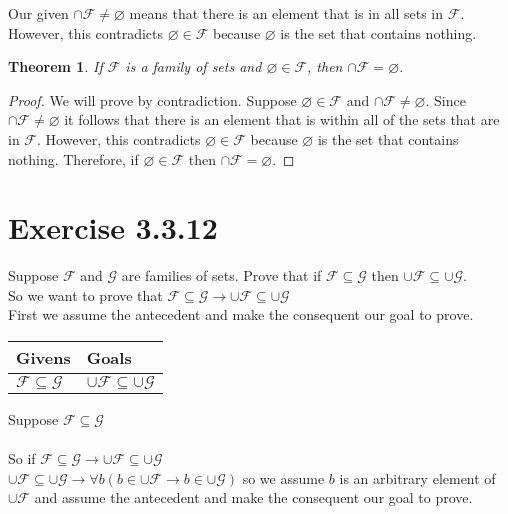 \documentclass{article}
\newcommand{\n}{ \noindent }
\newcommand{\F}{\mathcal{F}}
\newcommand{\G}{\mathcal{G}}
\newtheorem*{theorem}{Theorem}  %
\begin{document}
\n Our given $\cap \F \neq \varnothing$ means that there is an element that is in all sets in $\F$. However, this contradicts $\varnothing \in \F$ because $\varnothing$ is the set that contains nothing.

\begin{theorem} If $\F$ is a family of sets and $\varnothing \in \F$, then $\cap \F = \varnothing$.
\end{theorem}
\begin{proof}
We will prove by contradiction. Suppose $\varnothing \in \F$ and $\cap \F \neq \varnothing$. Since $\cap \F \neq \varnothing$ it follows that there is an element that is within all of the sets that are in $\F$. However, this contradicts $\varnothing \in \F$ because $\varnothing$ is the set that contains nothing. Therefore, if $\varnothing \in \F$ then $\cap \F = \varnothing$.
\end{proof}


\section*{Exercise 3.3.12}
\n Suppose $\F$ and $\G$ are families of sets. Prove that if $\F \subseteq \G$ then 
$\cup \F \subseteq \cup \G$. \\

\n So we want to prove that 
$\F \subseteq \G \rightarrow \cup \F \subseteq \cup \G$ \\

\n First we assume the antecedent and make the consequent our goal to prove.

\begin{table}[h]
\begin{tabular}{ll}
\hline
Givens & Goals   \\ \hline
$\F \subseteq \G$ & $\cup \F \subseteq \cup \G$   \\ \hline

\end{tabular}
\end{table}

\n Suppose $\F \subseteq \G$ \\
\indent [proof of $\cup \F \subseteq \cup \G$ ] \\
\n So if $\F \subseteq \G \rightarrow \cup \F \subseteq \cup \G$ \\


\n $\cup \F \subseteq \cup \G \rightarrow \forall b (b \in \cup \F \rightarrow b \in \cup \G)$ so we assume $b$ is an arbitrary element of $\cup \F$ and assume the antecedent and make the consequent our goal to prove. \\
\end{document}
